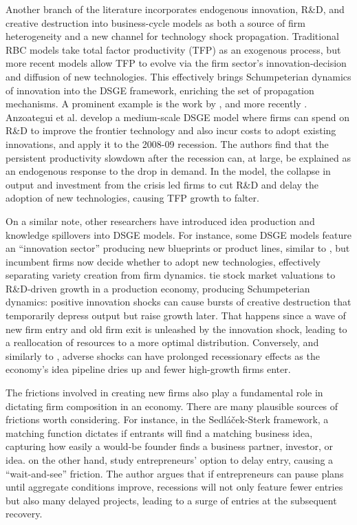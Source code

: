 \documentclass[a4paper,12pt]{article} %
\numberwithin{equation}{section} %
\numberwithin{figure}{section}
\numberwithin{table}{section}
\begin{document}
Another branch of the literature incorporates endogenous innovation, R\&D, and creative destruction into business-cycle models as both a source of firm heterogeneity and a 
new channel for technology shock propagation. Traditional RBC models take total factor productivity (TFP) as an exogenous process, but more recent models allow TFP to evolve via 
the firm sector's innovation-decision and diffusion of new technologies. This effectively brings Schumpeterian dynamics of innovation into the DSGE framework, enriching the 
set of propagation mechanisms.  A prominent example is the work by \textcite{comin2006medium}, and more recently \textcite{anzoategui2019endogenous}. Anzoategui et al. 
develop a medium-scale DSGE model where firms can spend on R\&D to improve the frontier technology and also incur costs to adopt existing innovations, and apply it to the 2008-09 recession. 
The authors find that the persistent productivity slowdown after the recession can, at large, be explained as an endogenous response to the drop in demand. In the model, the collapse in output 
and investment from the crisis led firms to cut R\&D and delay the adoption of new technologies, causing TFP growth to falter.

On a similar note, other researchers have introduced idea production and knowledge spillovers into DSGE models. For instance,
some DSGE models feature an ``innovation sector'' producing new blueprints or product lines, similar to \textcite{bilbiie2012endogenous},
but incumbent firms now decide whether to adopt new technologies, effectively separating variety creation from firm dynamics.
\textcite{kung2015innovation} tie stock market valuations to R\&D-driven growth in a production economy, producing Schumpeterian dynamics: 
positive innovation shocks can cause bursts of creative destruction that temporarily depress output but raise growth later. That happens 
since a wave of new firm entry and old firm exit is unleashed by the innovation shock, leading to a reallocation of resources to a more 
optimal distribution. Conversely, and similarly to \textcite{sedlavcek2017growth}, adverse shocks can have prolonged recessionary effects
as the economy's idea pipeline dries up and fewer high-growth firms enter.


The frictions involved in creating new firms also play a fundamental role in dictating firm composition in an economy. There are many plausible 
sources of frictions worth considering. For instance, in the Sedláček-Sterk framework, a matching function dictates if entrants will find a matching
business idea, capturing how easily a would-be founder finds a business partner, investor, or idea. \textcite{vardishvili2023entry} on the other hand,
study entrepreneurs' option to delay entry, causing a ``wait-and-see'' friction. The author argues that if entrepreneurs can pause plans until aggregate
conditions improve, recessions will not only feature fewer entries but also many delayed projects, leading to a surge of entries at the subsequent recovery.
\end{document}
